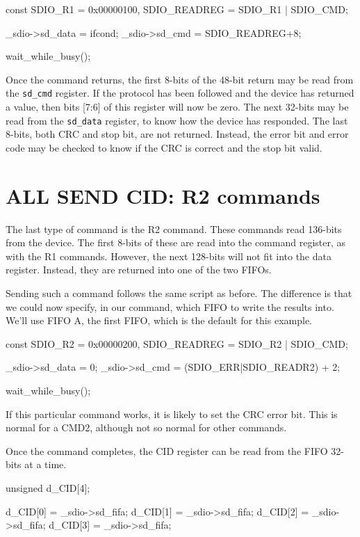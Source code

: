 \documentclass{gqtekspec}
\begin{document}
\begin{CPP}
	const	SDIO_R1      = 0x00000100,
		SDIO_READREG = SDIO_R1 | SDIO_CMD;

	_sdio->sd_data = ifcond;
	_sdio->sd_cmd = SDIO_READREG+8;

	wait_while_busy();
\end{CPP}

Once the command returns, the first 8-bits of the 48-bit return may be
read from the {\tt sd_cmd} register.  If the protocol has been followed and
the device has returned a value, then bits [7:6] of this register will now
be zero.  The next 32-bits may be read from the {\tt sd\_data} register, to
know how the device has responded.  The last 8-bits, both CRC and stop bit,
are not returned.  Instead, the error bit and error code may be checked
to know if the CRC is correct and the stop bit valid.

\section{ALL SEND CID: R2 commands}
The last type of command is the R2 command.  These commands read 136-bits
from the device.  The first 8-bits of these are read into the command register,
as with the R1 commands.  However, the next 128-bits will not fit into the
data register.  Instead, they are returned into one of the two FIFOs.

Sending such a command follows the same script as before.  The difference is
that we could now specify, in our command, which FIFO to write the results into.
We'll use FIFO A, the first FIFO, which is the default for this example.

\begin{CPP}
	const	SDIO_R2      = 0x00000200,
		SDIO_READREG = SDIO_R2 | SDIO_CMD;

	_sdio->sd_data = 0;
	_sdio->sd_cmd = (SDIO_ERR|SDIO_READR2) + 2;

	wait_while_busy();
\end{CPP}

If this particular command works, it is likely to set the CRC error bit.
This is normal for a CMD2, although not so normal for other commands.

Once the command completes, the CID register can be read from the FIFO
32-bits at a time.

\begin{CPP}
	unsigned	d_CID[4];

	d_CID[0] = _sdio->sd_fifa;
	d_CID[1] = _sdio->sd_fifa;
	d_CID[2] = _sdio->sd_fifa;
	d_CID[3] = _sdio->sd_fifa;
\end{CPP}
\end{document}

